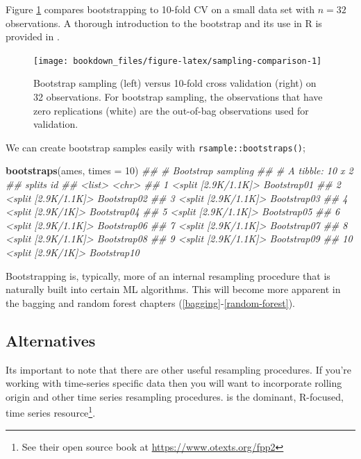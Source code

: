 \documentclass[]{krantz}
\makeatletter
\newenvironment{Shaded}{\begin{snugshade}}{\end{snugshade}}
\newcommand{\CommentTok}[1]{\textcolor[rgb]{0.37,0.37,0.37}{\textit{#1}}}
\newcommand{\DataTypeTok}[1]{\textcolor[rgb]{0.27,0.27,0.27}{#1}}
\newcommand{\DecValTok}[1]{\textcolor[rgb]{0.06,0.06,0.06}{#1}}
\newcommand{\KeywordTok}[1]{\textcolor[rgb]{0.27,0.27,0.27}{\textbf{#1}}}
\newcommand{\NormalTok}[1]{#1}
\newenvironment{kframe}{%
\medskip{}
\setlength{\fboxsep}{.8em}
 \def\at@end@of@kframe{}%
 \ifinner\ifhmode%
  \def\at@end@of@kframe{\end{minipage}}%
  \begin{minipage}{\columnwidth}%
 \fi\fi%
 \def\FrameCommand##1{\hskip\@totalleftmargin \hskip-\fboxsep
 \colorbox{shadecolor}{##1}\hskip-\fboxsep
     \hskip-\linewidth \hskip-\@totalleftmargin \hskip\columnwidth}%
 \MakeFramed {\advance\hsize-\width
   \@totalleftmargin\z@ \linewidth\hsize
   \@setminipage}}%
 {\par\unskip\endMakeFramed%
 \at@end@of@kframe}
\renewenvironment{Shaded}{\begin{kframe}}{\end{kframe}}
\makeatother
\begin{document}
Figure \ref{fig:sampling-comparison} compares bootstrapping to 10-fold CV on a small data set with \(n = 32\) observations. A thorough introduction to the bootstrap and its use in R is provided in \citet{davison1997bootstrap}.

\begin{figure}

{\centering \texttt{[image: bookdown\_files/figure-latex/sampling-comparison-1]} 

}

\caption{Bootstrap sampling (left) versus 10-fold cross validation (right) on 32 observations. For bootstrap sampling, the observations that have zero replications (white) are the out-of-bag observations used for validation.}\label{fig:sampling-comparison}
\end{figure}

We can create bootstrap samples easily with \texttt{rsample::bootstraps()};

\begin{Shaded}
\begin{Highlighting}[]
\KeywordTok{bootstraps}\NormalTok{(ames, }\DataTypeTok{times =} \DecValTok{10}\NormalTok{)}
\CommentTok{## # Bootstrap sampling }
\CommentTok{## # A tibble: 10 x 2}
\CommentTok{##    splits              id         }
\CommentTok{##    <list>              <chr>      }
\CommentTok{##  1 <split [2.9K/1.1K]> Bootstrap01}
\CommentTok{##  2 <split [2.9K/1.1K]> Bootstrap02}
\CommentTok{##  3 <split [2.9K/1.1K]> Bootstrap03}
\CommentTok{##  4 <split [2.9K/1K]>   Bootstrap04}
\CommentTok{##  5 <split [2.9K/1.1K]> Bootstrap05}
\CommentTok{##  6 <split [2.9K/1.1K]> Bootstrap06}
\CommentTok{##  7 <split [2.9K/1.1K]> Bootstrap07}
\CommentTok{##  8 <split [2.9K/1.1K]> Bootstrap08}
\CommentTok{##  9 <split [2.9K/1.1K]> Bootstrap09}
\CommentTok{## 10 <split [2.9K/1K]>   Bootstrap10}
\end{Highlighting}
\end{Shaded}

Bootstrapping is, typically, more of an internal resampling procedure that is naturally built into certain ML algorithms. This will become more apparent in the bagging and random forest chapters (\ref{bagging}-\ref{random-forest}).

\hypertarget{alternatives}{%
\subsection{Alternatives}\label{alternatives}}

Its important to note that there are other useful resampling procedures. If you're working with time-series specific data then you will want to incorporate rolling origin and other time series resampling procedures. \citet{hyndman2018forecasting} is the dominant, R-focused, time series resource\footnote{See their open source book at \url{https://www.otexts.org/fpp2}}.
\end{document}
